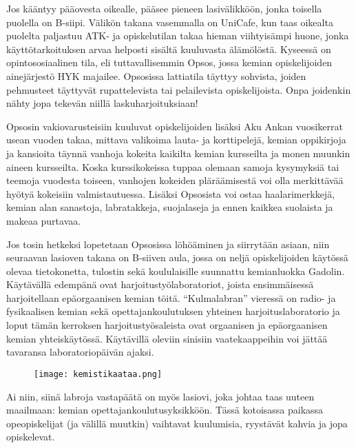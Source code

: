 \documentclass[../ala_hataile.tex]{subfiles}
\begin{document}
	Jos kääntyy pääovesta oikealle, pääsee pieneen lasivälikköön,
	jonka toisella puolella on
	B-siipi. Välikön takana vasemmalla
	on UniCafe, kun taas oikealta puolelta paljastuu 
	ATK- ja opiskelutilan takaa hieman
	viihtyisämpi huone, jonka käyttötarkoituksen
	arvaa helposti sisältä kuuluvasta
	älämölöstä. Kyseessä on opintososiaalinen
	tila, eli tuttavallisemmin Opsos, jossa kemian
	opiskelijoiden ainejärjestö HYK majailee.
	Opsosissa lattiatila täyttyy sohvista,
	joiden pehmusteet täyttyvät rupattelevista
	tai pelailevista opiskelijoista. Onpa joidenkin
	nähty jopa tekevän niillä laskuharjoituksiaan!
	
	Opsosin vakiovarusteisiin kuuluvat
	opiskelijoiden lisäksi Aku Ankan vuosikerrat
	usean vuoden takaa, mittava valikoima
	lauta- ja korttipelejä, kemian oppikirjoja
	ja kansioita täynnä vanhoja kokeita kaikilta
	kemian kursseilta ja monen muunkin
	aineen kursseilta. Koska kurssikokeissa
	tuppaa olemaan samoja kysymyksiä tai teemoja
	vuodesta toiseen, vanhojen kokeiden
	pläräämisestä voi olla merkittävää hyötyä
	kokeisiin valmistautuessa.
	Lisäksi Opsosista voi ostaa haalarimerkkejä, kemian alan sanastoja,
	labratakkeja, suojalaseja ja ennen kaikkea
	suolaista ja makeaa purtavaa.
	
	Jos tosin hetkeksi lopetetaan Opsosissa löhöäminen ja siirrytään asiaan, 
	niin seuraavan lasioven takana on B-siiven aula, 
	jossa on neljä opiskelijoiden käytössä olevaa tietokonetta, 
	tulostin sekä koululaisille suunnattu kemianluokka Gadolin. Käytävällä edempänä ovat
	harjoitustyölaboratoriot, joista ensimmäisessä harjoitellaan epäorgaanisen kemian
	töitä. ``Kulmalabran'' vieressä on
	radio- ja fysikaalisen kemian sekä opettajankoulutuksen
	yhteinen harjoituslaboratorio
	ja loput tämän kerroksen harjoitustyösaleista
	ovat orgaanisen ja epäorgaanisen
	kemian yhteiskäytössä. Käytävillä oleviin
	sinisiin vaatekaappeihin voi jättää tavaransa
	laboratoriopäivän ajaksi.
	\begin{figure}[b!]
		\centering
		\texttt{[image: kemistikaataa.png]}
	\end{figure}
	
	Ai niin, siinä labroja vastapäätä on myös lasiovi, joka johtaa taas
	uuteen maailmaan: kemian opettajan\-koulutus\-yksikköön.
	Tässä kotoisassa paikassa
	ope\-opiskelijat (ja välillä muutkin) vaihtavat
	kuulumisia, ryystävät kahvia ja jopa
	opiskelevat.
	
\end{document}
